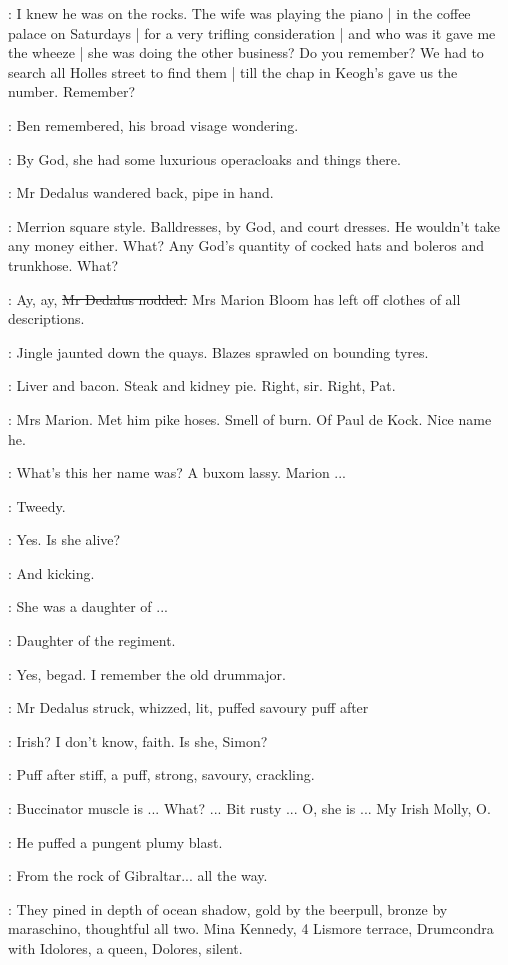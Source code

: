 \cowley:
I knew he was on the rocks.
The wife was playing the piano |
in the coffee palace on Saturdays |
for a very trifling consideration |
and who was it gave me the wheeze |
she was doing the other business?
Do you remember?
We had to search all Holles street to find them |
till the chap in Keogh's gave us the number.
Remember?

:
Ben remembered,
his broad visage wondering.

\dollard:
By God,
she had some luxurious operacloaks
and things there.

:
Mr Dedalus wandered back,
pipe in hand.

\dollard:
Merrion square style.
Balldresses,
by God,
and court dresses.
He wouldn't take any money either.
What?
Any God's quantity of cocked hats
and boleros and trunkhose.
What?

\simon:
Ay, ay,
\sout{Mr Dedalus nodded.}
Mrs Marion Bloom has left off clothes of all descriptions.

:
Jingle jaunted down the quays.
Blazes sprawled on bounding tyres.

\BloomInt:
Liver and bacon.
Steak and kidney pie.
Right, sir.
Right, Pat.

\BloomInt:
Mrs Marion.
Met him pike hoses.
Smell of burn.
Of Paul de Kock.
Nice name he.

\dollard:
What's this her name was?
A buxom lassy.
Marion ...

\simon:
Tweedy.

\dollard:
Yes.
Is she alive?

\simon:
And kicking.

\dollard:
She was a daughter of ...

\simon:
Daughter of the regiment.

\dollard:
Yes,
begad.
I remember the old drummajor.

:
Mr Dedalus struck,
whizzed,
lit,
puffed savoury puff after

\dollard:
Irish?
I don't know,
faith.
Is she,
Simon?

:
Puff after stiff,
a puff,
strong,
savoury,
crackling.

\simon:
Buccinator muscle is ...
What?
...
Bit rusty ...
O,
she is ...
My Irish Molly,
O.

:
He puffed a pungent plumy blast.

\simon:
From the rock of Gibraltar...
all the way.

:
They pined in depth of ocean shadow,
gold by the beerpull,
bronze by maraschino,
thoughtful all two.
Mina Kennedy,
4 Lismore terrace,
Drumcondra
with Idolores,
a queen,
Dolores,
silent.

